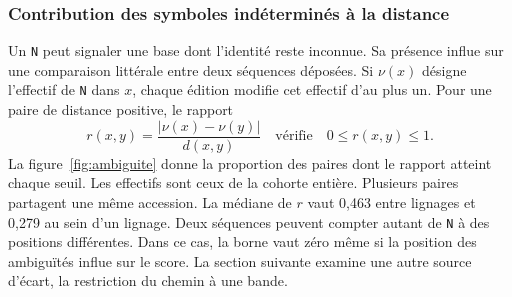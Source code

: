 \subsubsection{Contribution des symboles indéterminés à la distance}
Un \texttt{N} peut signaler une base dont l'identité reste inconnue. Sa présence influe sur une comparaison littérale entre deux séquences déposées. Si \(\nu(x)\) désigne l'effectif de \texttt{N} dans \(x\), chaque édition modifie cet effectif d'au plus un. Pour une paire de distance positive, le rapport
\[
 r(x,y)=\frac{|\nu(x)-\nu(y)|}{d(x,y)}\quad\text{vérifie}\quad 0\le r(x,y)\le1.
\]
La figure~\ref{fig:ambiguite} donne la proportion des paires dont le rapport atteint chaque seuil. Les effectifs sont ceux de la cohorte entière. Plusieurs paires partagent une même accession.
La médiane de \(r\) vaut 0,463 entre lignages et 0,279 au sein d'un lignage. Deux séquences peuvent compter autant de \texttt{N} à des positions différentes. Dans ce cas, la borne vaut zéro même si la position des ambiguïtés influe sur le score. La section suivante examine une autre source d'écart, la restriction du chemin à une bande.
